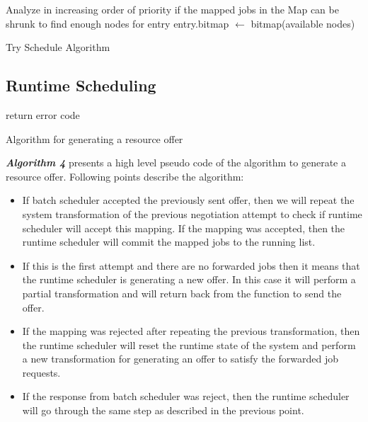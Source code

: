 \setcounter{AlgoLine}{0}
\begin{algorithm}[!htbp]
 \DontPrintSemicolon
 Analyze in increasing order of priority if the mapped jobs in the Map can be shrunk to find enough nodes for entry\;
 entry.bitmap $\leftarrow$ bitmap(available nodes)\;
 \caption{Try Schedule Algorithm}
\end{algorithm}
\setcounter{AlgoLine}{0}
\subsection{Runtime Scheduling}
\begin{algorithm}[!t]
 \DontPrintSemicolon
 return error code\; 
 \caption{Algorithm for generating a resource offer}
\end{algorithm}
\noindent
\textbf{\textit{Algorithm 4}} presents a high level pseudo code of the algorithm to generate a resource offer. Following points describe the algorithm:
\begin{itemize}
\item If batch scheduler accepted the previously sent offer, then we will repeat the system transformation of the previous negotiation attempt to check if runtime scheduler will accept this mapping. If the mapping was accepted, then the runtime scheduler will commit the mapped jobs to the running list. 
\item If this is the first attempt and there are no forwarded jobs then it means that the runtime scheduler is generating a new offer. In this case it will perform a partial transformation and will return back from the function to send the offer.
\item If the mapping was rejected after repeating the previous transformation, then the runtime scheduler will reset the runtime state of the system and perform a new transformation for generating an offer to satisfy the forwarded job requests.
\item If the response from batch scheduler was reject, then the runtime scheduler will go through the same step as described in the previous point.
\end{itemize}
